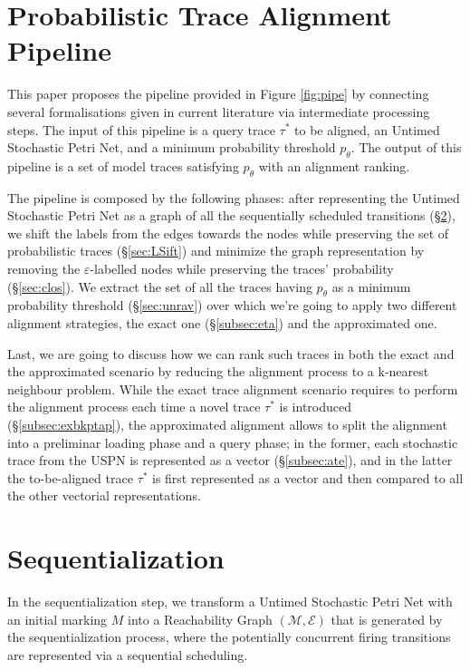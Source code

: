 \section{Probabilistic Trace Alignment Pipeline}
This paper proposes the pipeline provided in Figure \ref{fig:pipe} by connecting several formalisations given in current literature via intermediate processing steps. The input of this pipeline is a query trace $\tau^*$ to be aligned, an Untimed Stochastic Petri Net, and a minimum probability threshold $p_\theta$. The output of this pipeline is a set of model traces satisfying $p_\theta$ with an alignment ranking.

The pipeline is composed by the following phases: after representing the Untimed Stochastic Petri Net as a graph of all the sequentially scheduled transitions (\S\ref{sec:seqZ}), we shift the labels from the edges towards the nodes while preserving the set of probabilistic traces (\S\ref{sec:LSift}) and minimize the graph representation by removing the $\varepsilon$-labelled nodes while preserving the traces' probability (\S\ref{sec:clos}). We extract the set of all the traces having $p_\theta$ as a minimum probability threshold (\S\ref{sec:unrav}) over which we're going to apply two different alignment strategies, the exact one (\S\ref{subsec:eta}) and the approximated one. 


Last, we are going to discuss how we can rank such traces in both the exact and the approximated scenario by reducing the alignment process to a k-nearest neighbour problem. While the exact trace alignment scenario requires to perform the alignment process each time a novel trace $\tau^*$ is introduced (\S\ref{subsec:exbkptap}), the approximated alignment allows to split the alignment into a preliminar loading phase and a query phase; in the former, each stochastic trace from the USPN is represented as a vector (\S\ref{subsec:ate}), and in the latter the to-be-aligned trace $\tau^*$ is first represented as a vector and then compared to all the other vectorial representations.  

\section{Sequentialization}\label{sec:seqZ}
In the sequentialization step, we transform a Untimed Stochastic Petri Net with an initial marking $M$ into a Reachability Graph $(\mathcal{M},\mathcal{E})$ that is generated by the sequentialization process, where the potentially concurrent firing transitions are represented via a sequential scheduling. 

